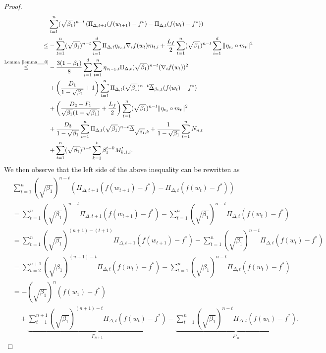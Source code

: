 \documentclass{article} %
\begin{document}
\begin{proof}
\begin{align}
&\sum_{t=1}^{n} (\sqrt{\beta_{1}})^{n-t} \left(\Pi_{\Delta,t+1}(f(w_{t+1}) - f^*) - \Pi_{\Delta,t}(f(w_{t}) - f^*)\right)\notag\\\le&- \sum_{t=1}^{n} (\sqrt{\beta_{1}})^{n-t} \sum_{i=1}^{d}\Pi_{\Delta,t}\eta_{v_{t},i}\nabla_{i}f(w_{t})m_{t,i} +\frac{L_{f}}{2}\sum_{t=1}^{n} (\sqrt{\beta_{1}})^{n-t}\sum_{i=1}^{d}\|\eta_{v_{t}}\circ m_{t}\|^{2}\notag\\\mathop{\le}^{\text{Lemma \ref{lemma__0}}}&-\frac{3(1-\beta_{1})}{8}\sum_{i=1}^{d}\sum_{t=1}^{n}\eta_{v_{t-1},i}\Pi_{\Delta,t}(\sqrt{\beta_{1}})^{n-t}(\nabla_{i}f(w_{t}))^{2}\notag\\&+\left(\frac{D_{1}}{1-\sqrt{\beta_{1}}}+1\right)\sum_{t=1}^{n}\Pi_{\Delta,t}(\sqrt{\beta_{1}})^{n-t}\overline{\Delta}_{\beta_{1},t}(f(w_{t})-f^*)\notag\\&+\left(\frac{D_{2}+F_1}{\sqrt{\beta_{1}}(1-\sqrt{\beta_{1}})}+\frac{L_{f}}{2}\right)\sum_{t=1}^{n}(\sqrt{\beta_{1}})^{n-t}\|\eta_{v_{t}}\circ m_{t}\|^{2}\notag\\&+\frac{D_{3}}{1-\sqrt{\beta_{1}}}\sum_{t=1}^{n}\Pi_{\Delta,t}(\sqrt{\beta_{1}})^{n-t}\overline{\Delta}_{\sqrt{\beta_{1}},k}+\frac{{1}}{1-\sqrt{\beta_{1}}}\sum_{t=1}^{n}N_{n,t}\notag\\&+\sum_{t=1}^{n}(\sqrt{\beta_{1}})^{n-t}\sum_{k=1}^{t}\beta_{1}^{t-k}M_{k,1,i}'.  
\end{align}
We then observe that the left side of the above inequality can be rewritten as 
\begin{align*}
&\sum_{t=1}^{n} (\sqrt{\beta_{1}})^{n-t} \left(\Pi_{\Delta,t+1}(f(w_{t+1}) - f^*) - \Pi_{\Delta,t}(f(w_{t}) - f^*)\right)\\&=\sum_{t=1}^{n} (\sqrt{\beta_{1}})^{n-t}\Pi_{\Delta,t+1}(f(w_{t+1}) - f^*)-\sum_{t=1}^{n} (\sqrt{\beta_{1}})^{n-t}\Pi_{\Delta,t}(f(w_{t}) - f^*)\\&=\sum_{t=1}^{n} (\sqrt{\beta_{1}})^{(n+1)-(t+1)}\Pi_{\Delta,t+1}(f(w_{t+1}) - f^*)-\sum_{t=1}^{n} (\sqrt{\beta_{1}})^{n-t}\Pi_{\Delta,t}(f(w_{t}) - f^*)\\&=\sum_{t=2}^{n+1} (\sqrt{\beta_{1}})^{(n+1)-t}\Pi_{\Delta,t}(f(w_{t}) - f^*)-\sum_{t=1}^{n} (\sqrt{\beta_{1}})^{n-t}\Pi_{\Delta,t}(f(w_{t}) - f^*)\\&=-(\sqrt{\beta_{1}})^{n}(f(w_1)-f^*)\\&\quad+\underbrace{\sum_{t=1}^{n+1} (\sqrt{\beta_{1}})^{(n+1)-t}\Pi_{\Delta,t}(f(w_{t}) - f^*)}_{F_{n+1}}-\underbrace{\sum_{t=1}^{n} (\sqrt{\beta_{1}})^{n-t}\Pi_{\Delta,t}(f(w_{t}) - f^*)}_{F'_{n}}.
\end{align*}

\end{proof}
\end{document}
